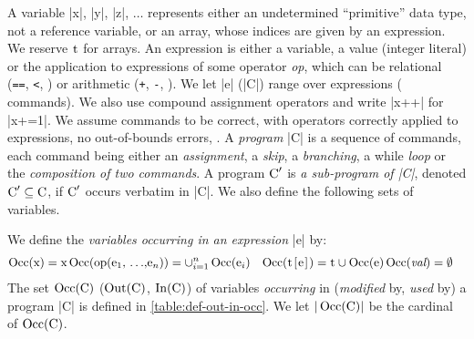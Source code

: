 A variable \prc|x|, \prc|y|, \prc|z|, \(\hdots\) represents either an
undetermined \enquote{primitive} data type, \eg not a reference variable, or an
array, whose indices are given by an expression. We reserve $\prc|t|$ for
arrays. An expression is either a variable, a value (\eg integer literal) or the
application to expressions of some operator \emph{op}, which can be \eg
relational (\texttt{==},  \texttt{<}, \etc) or arithmetic  (\texttt{+},
\texttt{-}, \etc). We let \prc|e| (\resp \prc|C|) range over expressions (\resp
commands). We also use compound assignment operators and write \eg \prc|x++| for
\prc|x+=1|. We assume commands to be correct, \eg with operators correctly
applied to expressions, no out-of-bounds errors, \etc. A \emph{program} \prc|C|
is a sequence of commands, each command being either an \emph{assignment}, a
\emph{skip}, a \emph{branching}, a while \emph{loop} or the \emph{composition of
two commands}. A program $\prc|C|'$ is \emph{a sub-program of \prc|C|}, denoted
\(\prc|C|' \subseteq \prc|C|\), if $\prc|C|'$ occurs verbatim in \prc|C|. We
also define the following sets of variables.

\begin{definition}%
\label{def:in-out-occ}
We define the \emph{variables occurring in an expression} \prc|e| by:
\[\begin{aligned}[t]
\Occ(\prc|x|) =\prc|x| &
\Occ(\prc|op(e$_1$, $\hdots$,e$_n$)|) = \cup_{i = 1}^n \Occ(\prc|e$_i$|) &
\Occ(\prc|t[e]|) =\prc|t| \cup \Occ(\prc|e|) &
\Occ(\emph{val}) =\emptyset
\end{aligned}\]
\noindent
The set \(\Occ(\prc|C|)\) (\resp $\Out(\prc|C|)$, $\In(\prc|C|)$) of variables
\emph{occurring} in (\resp \emph{modified} by, \emph{used} by) a program \prc|C|
is defined in \autoref{table:def-out-in-occ}. We let $|\Occ(\prc|C|)|$ be the
cardinal of \(\Occ(\prc|C|)\).
\end{definition}

